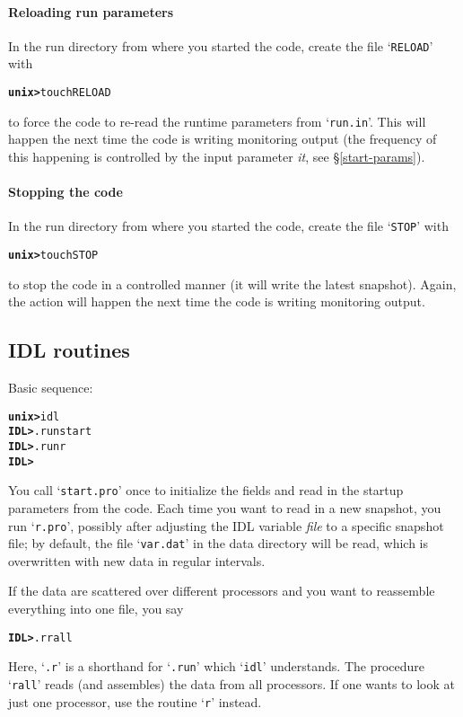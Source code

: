 \documentclass[12pt,twoside,notitlepage,a4paper]{article}
\makeatletter
\newcommand{\prompt}[1]{{\ttfamily\bfseries{}#1}}
\newcommand{\var}[1]{\textsl{#1}\index{#1@\emph{#1}}\/}
\newcommand{\file}[1]{`\texttt{#1}'}
\makeatother
\begin{document}
\paragraph{Reloading run parameters}
In the run directory from where you started the code, create the file
\file{RELOAD} with
\begin{alltt}
  \prompt{unix> } touch RELOAD \
\end{alltt}
to force the code to re-read the runtime parameters from \file{run.in}.
This will happen the next time the code is writing monitoring output (the
frequency of this happening is controlled by the input parameter \var{it},
see \S\ref{start-params}).

\paragraph{Stopping the code}
In the run directory from where you started the code, create the file
\file{STOP} with
\begin{alltt}
  \prompt{unix> } touch STOP \
\end{alltt}
to stop the code in a controlled manner (it will write the latest
snapshot).
Again, the action will happen the next time the code is writing monitoring
output.


\subsection{IDL routines}
\label{S_IDLroutines}

Basic sequence:
\begin{alltt}
  \prompt{unix> } idl
  \prompt{IDL> }  .run start
  \prompt{IDL> }  .run r
  \prompt{IDL> }  {} \
\end{alltt}
You call \file{start.pro} once to initialize the fields and read in the
startup parameters from the code.
Each time you want to read in a new snapshot, you run \file{r.pro},
possibly after adjusting the IDL variable \var{file} to a specific snapshot
file; by default, the file \file{var.dat} in the data directory will be
read, which is overwritten with new data in regular intervals.

If the data are scattered over different processors and you want to
reassemble everything into one file, you say
\begin{alltt}
  \prompt{IDL> }  .r rall
\end{alltt}
Here, \file{.r} is a shorthand for \file{.run} which \file{idl} understands.
The procedure \file{rall} reads (and assembles) the data from all processors.
If one wants to look at just one processor, use the routine \file{r} instead.
\end{document}
